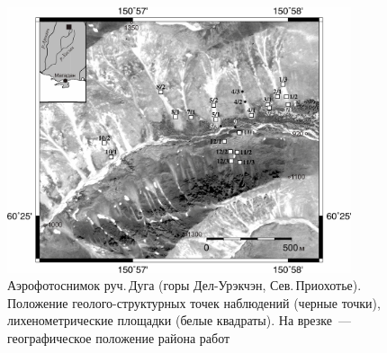 \begin{figure}
  \begin{center}
    \includegraphics[width=0.9\textwidth]{authors/kolegov-fig.jpg}
  \end{center}
  \caption{Аэрофотоснимок руч.\,Дуга (горы Дел-Урэкчэн, Сев.\,Приохотье).
  Положение геолого-структурных точек наблюдений (черные точки),
  лихенометрические площадки (белые квадраты). На врезке~--- географическое
  положение района работ}
  \label{fig:kolegov}
\end{figure}
